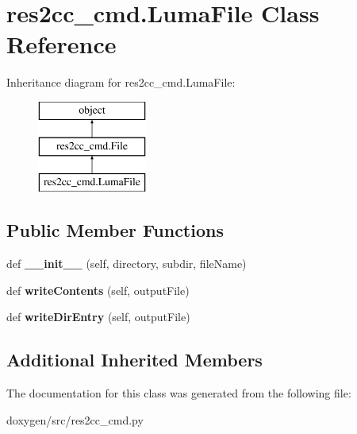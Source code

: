 \hypertarget{classres2cc__cmd_1_1_luma_file}{}\section{res2cc\+\_\+cmd.\+Luma\+File Class Reference}
\label{classres2cc__cmd_1_1_luma_file}
Inheritance diagram for res2cc\+\_\+cmd.\+Luma\+File\+:\begin{figure}[H]
\begin{center}
\leavevmode
\includegraphics[height=3.000000cm]{classres2cc__cmd_1_1_luma_file}
\end{center}
\end{figure}
\subsection*{Public Member Functions}
\begin{DoxyCompactItemize}
\item 
\mbox{\label{classres2cc__cmd_1_1_luma_file_a899035d468d17bb1cd25347f91c025b6}} 
def {\bfseries \+\_\+\+\_\+init\+\_\+\+\_\+} (self, directory, subdir, file\+Name)
\item 
\mbox{\label{classres2cc__cmd_1_1_luma_file_a74c9451f0779c7a3bda342c76e1f1f3e}} 
def {\bfseries write\+Contents} (self, output\+File)
\item 
\mbox{\label{classres2cc__cmd_1_1_luma_file_a16c5d82d02e8179e105127796b1e40b3}} 
def {\bfseries write\+Dir\+Entry} (self, output\+File)
\end{DoxyCompactItemize}
\subsection*{Additional Inherited Members}


The documentation for this class was generated from the following file\+:\begin{DoxyCompactItemize}
\item 
doxygen/src/res2cc\+\_\+cmd.\+py\end{DoxyCompactItemize}
